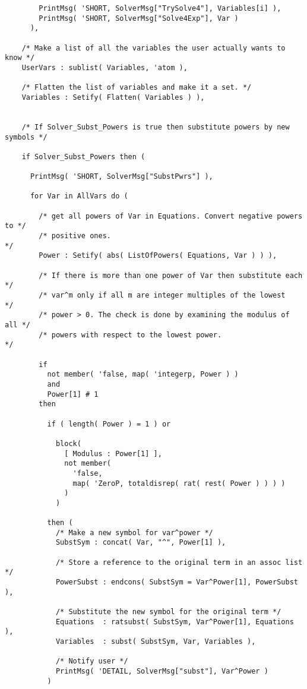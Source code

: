 \begin{verbatim}
        PrintMsg( 'SHORT, SolverMsg["TrySolve4"], Variables[i] ),
        PrintMsg( 'SHORT, SolverMsg["Solve4Exp"], Var )
      ),

    /* Make a list of all the variables the user actually wants to know */
    UserVars : sublist( Variables, 'atom ),

    /* Flatten the list of variables and make it a set. */
    Variables : Setify( Flatten( Variables ) ),


    /* If Solver_Subst_Powers is true then substitute powers by new symbols */

    if Solver_Subst_Powers then (

      PrintMsg( 'SHORT, SolverMsg["SubstPwrs"] ),

      for Var in AllVars do (

        /* get all powers of Var in Equations. Convert negative powers to */
        /* positive ones.                                                 */
        Power : Setify( abs( ListOfPowers( Equations, Var ) ) ),

        /* If there is more than one power of Var then substitute each  */
        /* var^m only if all m are integer multiples of the lowest      */
        /* power > 0. The check is done by examining the modulus of all */
        /* powers with respect to the lowest power.                     */

        if
          not member( 'false, map( 'integerp, Power ) )
          and
          Power[1] # 1
        then

          if ( length( Power ) = 1 ) or

            block(
              [ Modulus : Power[1] ],
              not member(
                'false,
                map( 'ZeroP, totaldisrep( rat( rest( Power ) ) ) )
              )
            )

          then (
            /* Make a new symbol for var^power */
            SubstSym : concat( Var, "^", Power[1] ),

            /* Store a reference to the original term in an assoc list */
            PowerSubst : endcons( SubstSym = Var^Power[1], PowerSubst ),

            /* Substitute the new symbol for the original term */
            Equations  : ratsubst( SubstSym, Var^Power[1], Equations ),
            Variables  : subst( SubstSym, Var, Variables ),

            /* Notify user */
            PrintMsg( 'DETAIL, SolverMsg["subst"], Var^Power )
          )


\end{verbatim}
